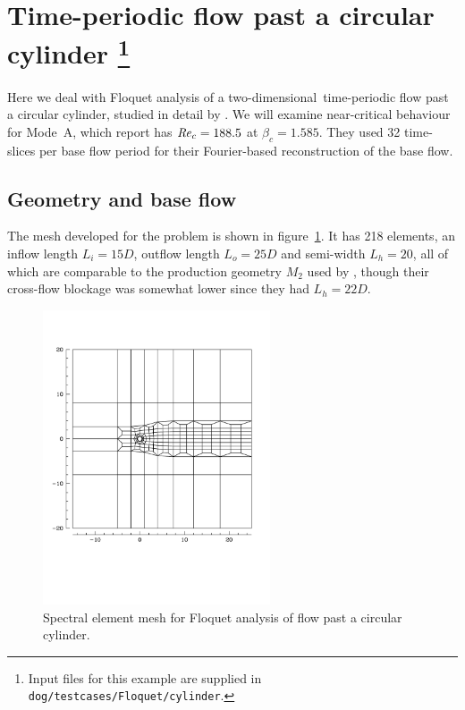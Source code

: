 \documentclass[11pt,a4paper]{report}
\newcommand\Rey{\mbox{\textit{Re}}}
\newcommand\twod{two-di\-men\-sion\-al}
\begin{document}
\section{Time-periodic flow past a circular cylinder
\protect\footnote{Input files for this example are supplied in
  \texttt{dog/testcases/Floquet/cylinder}.}  }
\label{sec.cyl2d}

Here we deal with Floquet analysis of a \twod\ time-periodic flow past
a circular cylinder, studied in detail by \citet{bah96}.  We will
examine near-critical behaviour for Mode~A, which \citeauthor{bah96}
report has $\Rey_c=188.5$ at $\beta_c=1.585$.  They used 32
time-slices per base flow period for their Fourier-based
reconstruction of the base flow.

\subsection{Geometry and base flow}

The mesh developed for the problem is shown in
figure~\ref{fig.cylinder}.  It has 218 elements, an inflow length
$L_i=15D$, outflow length $L_o=25D$ and semi-width $L_h=20$, all of
which are comparable to the production geometry $M_2$ used by
\citet{bah96}, though their cross-flow blockage was somewhat lower
since they had $L_h=22D$.

\begin{figure}
\begin{center}
\includegraphics[width=0.6\textwidth]{m32_2D_mesh}
\end{center}
\caption{Spectral element mesh for Floquet analysis of flow past a
  circular cylinder.}
\label{fig.cylinder}
\end{figure}
\end{document}
